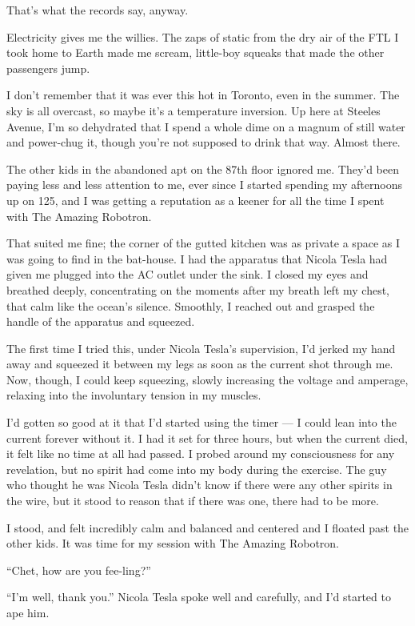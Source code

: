 That's what the records say, anyway.

Electricity gives me the willies. The zaps of static from the dry
air of the FTL I took home to Earth made me scream, little-boy
squeaks that made the other passengers jump.

I don't remember that it was ever this hot in Toronto, even in the
summer. The sky is all overcast, so maybe it's a temperature
inversion. Up here at Steeles Avenue, I'm so dehydrated that I
spend a whole dime on a magnum of still water and power-chug it,
though you're not supposed to drink that way. Almost there.

\tb

The other kids in the abandoned apt on the 87th floor ignored me.
They'd been paying less and less attention to me, ever since I
started spending my afternoons up on 125, and I was getting a
reputation as a keener for all the time I spent with The Amazing
Robotron.

That suited me fine; the corner of the gutted kitchen was as
private a space as I was going to find in the bat-house. I had the
apparatus that Nicola Tesla had given me plugged into the AC outlet
under the sink. I closed my eyes and breathed deeply, concentrating
on the moments after my breath left my chest, that calm like the
ocean's silence. Smoothly, I reached out and grasped the handle of
the apparatus and squeezed.

The first time I tried this, under Nicola Tesla's supervision, I'd
jerked my hand away and squeezed it between my legs as soon as the
current shot through me. Now, though, I could keep squeezing,
slowly increasing the voltage and amperage, relaxing into the
involuntary tension in my muscles.

I'd gotten so good at it that I'd started using the timer --- I
could lean into the current forever without it. I had it set for
three hours, but when the current died, it felt like no time at all
had passed. I probed around my consciousness for any revelation,
but no spirit had come into my body during the exercise. The guy
who thought he was Nicola Tesla didn't know if there were any other
spirits in the wire, but it stood to reason that if there was one,
there had to be more.

I stood, and felt incredibly calm and balanced and centered and I
floated past the other kids. It was time for my session with The
Amazing Robotron.

``Chet, how are you fee-ling?''

``I'm well, thank you.'' Nicola Tesla spoke well and carefully, and
I'd started to ape him.

